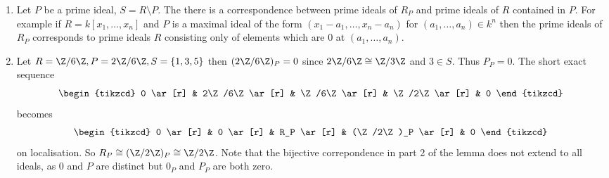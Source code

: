 \documentclass[a4paper]{article}
\begin{document}
\begin{eg}\leavevmode
  \begin{enumerate}
  \item Let \(P\) be a prime ideal, \(S = R \setminus P\). The there is a correspondence between prime ideals of \(R_P\) and prime ideals of \(R\) contained in \(P\). For example if \(R = k[x_1, \dots, x_n]\) and \(P\) is a maximal ideal of the form \((x_1 - a_1, \dots, x_n - a_n)\) for \((a_1, \dots, a_n) \in k^n\) then the prime ideals of \(R_P\) corresponds to prime ideals \(R\) consisting only of elements which are \(0\) at \((a_1, \dots, a_n)\).
  \item Let \(R = \Z/6\Z, P = 2\Z/6\Z, S = \{1, 3, 5\}\) then \((2\Z/6\Z)_P = 0\) since \(2\Z/6\Z \cong \Z/3\Z\) and \(3 \in S\). Thus \(P_P = 0\). The short exact sequence
    \[
      \begin{tikzcd}
        0 \ar[r] & 2\Z/6\Z \ar[r] & \Z/6\Z \ar[r] & \Z/2\Z \ar[r] & 0
      \end{tikzcd}
    \]
    becomes
    \[
      \begin{tikzcd}
        0 \ar[r] & 0 \ar[r] & R_P \ar[r] & (\Z/2\Z)_P \ar[r] & 0
      \end{tikzcd}
    \]
    on localisation. So \(R_P \cong (\Z/2\Z)_P \cong \Z/2\Z\). Note that the bijective correpondence in part 2 of the lemma does not extend to all ideals, as \(0\) and \(P\) are distinct but \(0_P\) and \(P_P\) are both zero.
  \end{enumerate}
\end{eg}
\end{document}
